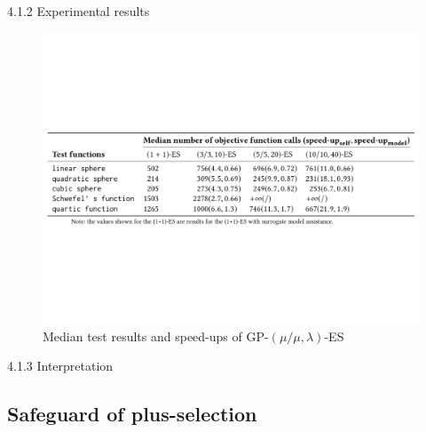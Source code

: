 \documentclass{beamer}
\begin{document}
\begin{frame}{4.1.2 Experimental results}

\begin{figure}
\includegraphics[width=1.0\linewidth]{tab-GP-mml-ES.pdf}
    \caption{Median test results and speed-ups of GP-$(\mu/\mu,\lambda)$-ES}
\end{figure}

\end{frame}
\begin{frame}{4.1.3 Interpretation}


\end{frame}


\subsection{Safeguard of plus-selection}
\end{document}
